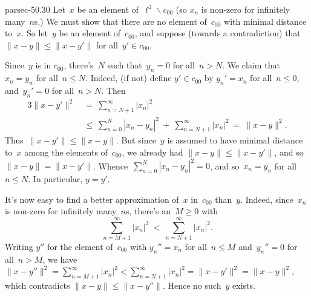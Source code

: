 \documentclass[b5page]{book}
\begin{document}
\begin{solution}{parsec-50.30}%
Let~$x$ be an element of~$\ell^2\backslash c_{00}$
    (so $x_n$ is non-zero for infinitely many~$n$s.)
We must show that there are no element of~$c_{00}$ with minimal
distance to~$x$.
So let~$y$ be an element of~$c_{00}$,
and suppose (towards a contradiction)
that~$\|x-y\|\leq \|x-y'\|$
for all~$y'\in c_{00}$.

Since~$y$ is in $c_{00}$,
there's~$N$ such that~$y_n=0$ for all~$n> N$.
We claim that~$x_n=y_n$ for all~$n\leq N$.
    Indeed, (if not) define $y'\in c_{00}$
    by $y_n' = x_n$ for all~$n\leq 0$, and~$y_n'=0$ for all~$n >N$.
    Then
\begin{alignat*}{3}
\textstyle
    \|x-y'\|^2\ &=\ 
\textstyle
    \sum_{n=N+1}^\infty \left|x_n\right|^2\\
    \ &\leq \ 
\textstyle
    \sum_{n=0}^N \left|x_n-y_n\right|^2 
    \ +\ \sum_{n=N+1}^\infty \left|x_n\right|^2
    \ = \ \|x-y\|^2.
\end{alignat*}
Thus~$\|x-y'\|\leq \|x-y\|$.
But since~$y$ is assumed to have minimal
distance to~$x$ among the elements of~$c_{00}$,
we already had $\|x-y\|\leq \|x-y'\|$,
and so~$\|x-y\|=\|x-y'\|$.
    Whence~$\sum_{n=0}^N \left|x_n-y_n\right|^2
    = 0$,
    and so~$x_n=y_n$ for all~$n\leq N$.
    In particular, $y=y'$.

It's now easy to find a better approximation
    of~$x$ in~$c_{00}$ than~$y$.
    Indeed, since~$x_n$ is non-zero for infinitely many~$n$s,
    there's an~$M\geq 0$ with 
    \begin{equation*}
        \textstyle
        \sum_{n=M+1}^\infty \left|x_n\right|^2
    \ <\  \sum_{n=N+1}^\infty \left|x_n\right|^2.
    \end{equation*}
    Writing $y''$ for the element of~$c_{00}$
    with $y_n''=x_n$ for all~$n\leq M$ and~$y_n''=0$
    for all~$n > M$,
    we have 
    $\|x-y''\|^2=\sum_{n=M+1}^\infty \left|x_n\right|^2
    < \sum_{n=N+1}^\infty \left|x_n\right|^2 = \|x-y'\|^2 = \|x-y\|^2$,
    which contradicts $\|x-y\|\leq \|x-y''\|$.
    Hence no such~$y$ exists.
\end{solution}
\end{document}
